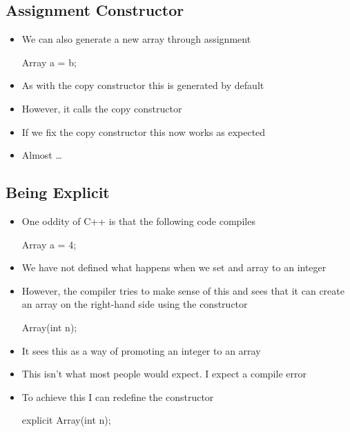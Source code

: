 
\begin{slide}
\section{Assignment Constructor}

\begin{itemize}
\item We can also generate a new array through assignment
  \begin{cpp}
    Array a = b;
  \end{cpp}
\item As with the copy constructor this is generated by default
\item However, it calls the copy constructor
\item If we fix the copy constructor this now works as expected
\item Almost \ldots
\end{itemize}

\end{slide}


\begin{slide}
  \section[-2]{Being Explicit}


  \begin{itemize}
  \item One oddity of C++ is that the following code compiles
    \begin{cpp}
      Array a = 4;
    \end{cpp}
    \vspace*{-1cm}
  \item We have not defined what happens when we set and array to an
    integer
  \item However, the compiler tries to make sense of this and sees
    that it can create an array on the right-hand side using the
    constructor
    \begin{cpp}
      Array(int n);
    \end{cpp}
    \vspace*{-1cm}
  \item It sees this as a way of promoting an integer to an array
  \item This isn't what most people would expect.  I expect a compile
    error
  \item To achieve this I can redefine the constructor
    \begin{cpp}
      explicit Array(int n);
    \end{cpp}
    \vspace*{-1cm}
  \end{itemize}


\end{slide}

